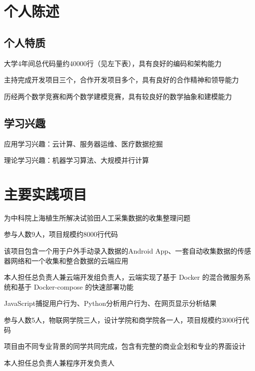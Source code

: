 \documentclass[]{deedy-resume-openfont}
\begin{document}
\hfill
\begin{minipage}[t]{0.73\textwidth}
    \section{个人陈述}
    \subsection{个人特质}
    \vspace{\topsep}
    \begin{tightemize}
		\item 大学4年间总代码量约40000行（见左下表），具有良好的编码和架构能力
		\item 主持完成开发项目三个，合作开发项目多个，具有良好的合作精神和领导能力
        \item 历经两个数学竞赛和两个数学建模竞赛，具有较良好的数学抽象和建模能力
	\end{tightemize}
    \subsection{学习兴趣}
    \vspace{\topsep}
	\begin{tightemize}
		\item 应用学习兴趣：云计算、服务器运维、医疗数据挖掘
		\item 理论学习兴趣：机器学习算法、大规模并行计算
	\end{tightemize}
    \sectionsep

    \section{主要实践项目}
	\begin{tightemize}
		\item 为中科院上海植生所解决试验田人工采集数据的收集整理问题
		\item 参与人数9人，项目规模约8000行代码
		\item 该项目包含一个用于户外手动录入数据的Android App、一套自动收集数据的传感 器网络和一个收集和整合数据的云端应用
		\item 本人担任总负责人兼云端开发组负责人，云端实现了基于 Docker 的混合微服务系 统和基于 Docker-compose 的快速部署功能
	\end{tightemize}
	\sectionsep

	\begin{tightemize}
		\item JavaScript捕捉用户行为、Python分析用户行为、在网页显示分析结果
		\item 参与人数5人，物联网学院三人，设计学院和商学院各一人，项目规模约3000行代码
		\item 项目由不同专业背景的同学共同完成，包含有完整的商业企划和专业的界面设计
		\item 本人担任总负责人兼程序开发负责人
	\end{tightemize}
    \sectionsep
    

\end{minipage}
\end{document}
